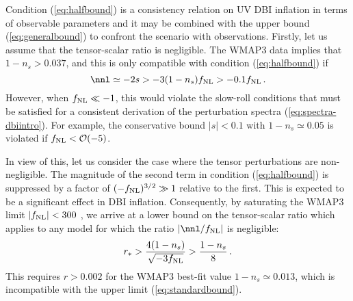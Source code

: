 Condition (\ref{eq:halfbound}) is a consistency relation on UV DBI 
inflation in terms of observable parameters and it 
may be combined with the upper bound 
(\ref{eq:generalbound}) to confront the scenario with observations.
Firstly, let us assume that the tensor-scalar ratio is negligible. 
The WMAP3 data implies that $1-n_s > 0.037$, and this is only 
compatible with condition (\ref{eq:halfbound}) if 
% 
\begin{equation}
\label{eq:nnlbound}
\nnl \simeq -2s > -3 (1-n_s ) \fnl > -0.1 \fnl \,.
\end{equation}
% 
However, when $f_{\mathrm{NL}} \ll -1$, this would violate the slow-roll conditions
that must be satisfied for a consistent 
derivation of the perturbation spectra 
(\ref{eq:spectra-dbiintro}). For example, the conservative 
bound $|s| < 0.1$ with $1-n_s \simeq 0.05$ is violated if  
$f_{\mathrm{NL}} < {\cal{O}} (-5)$. 

In view of this, let us consider the case where the tensor 
perturbations are non-negligible. 
The magnitude of the second term in condition (\ref{eq:halfbound}) 
is suppressed by a factor of $(-f_{\mathrm{NL}})^{3/2} \gg 1$ 
relative to the first. This is expected to 
be a significant effect in DBI inflation. 
Consequently, 
by saturating the WMAP3 limit $|f_{\mathrm{NL}}| < 300$ \cite{crim}, we arrive at 
a lower bound on the tensor-scalar ratio which applies   
to any model for which the ratio $|\nnl/\fnl|$ is 
negligible:
% 
\begin{equation}
\label{eq:lowerbound}
r_* >  \frac{4(1-n_s)}{\sqrt{-3f_{\mathrm{NL}}}} > \frac{1-n_s}{8} \,.
\end{equation}
% 
This requires $r > 0.002$ for the WMAP3 best-fit value 
$1-n_s \simeq 0.013$, which is incompatible with the upper limit 
(\ref{eq:standardbound}). 


